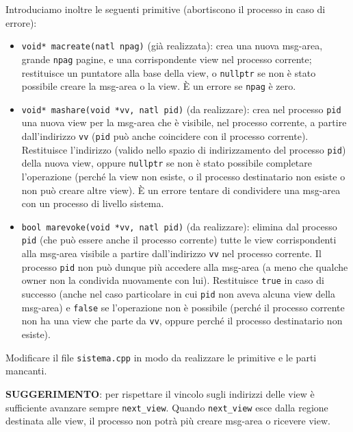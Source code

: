 Introduciamo inoltre le seguenti primitive (abortiscono il processo in caso di errore):

\begin{itemize}
  \item \verb|void* macreate(natl npag)| (gi\`a realizzata): crea una nuova msg-area, grande \verb|npag| pagine,
    e una corrispondente view nel processo corrente;
    restituisce un puntatore alla base della view, o \verb|nullptr| se non
    \`e stato possibile creare la msg-area o la view. \`E un errore se \verb|npag| \`e zero.
  \item \verb|void* mashare(void *vv, natl pid)| (da realizzare):
      crea nel processo \verb|pid| una nuova view per la msg-area
      che \`e visibile, nel processo corrente, a partire dall'indirizzo \verb|vv| (\verb|pid| pu\`o anche coincidere
      con il processo corrente). Restituisce l'indirizzo (valido nello
      spazio di indirizzamento del processo \verb|pid|) della nuova view, oppure \verb|nullptr| se non \`e stato
      possibile completare l'operazione (perch\'e la view non esiste, o il processo destinatario non esiste o non pu\`o
      creare altre view). \`E un errore tentare di condividere una msg-area con un processo di livello sistema.
    \item \verb|bool marevoke(void *vv, natl pid)| (da realizzare): elimina dal processo \verb|pid| (che pu\`o
      essere anche il processo corrente) tutte le view corrispondenti alla msg-area visibile
      a partire dall'indirizzo \verb|vv| nel processo corrente. Il processo \verb|pid| non pu\`o dunque pi\`u accedere alla msg-area (a meno
      che qualche owner non la condivida nuovamente con lui). Restituisce \verb|true| in caso di successo 
      (anche nel caso particolare in cui \verb|pid| non aveva alcuna view della msg-area) e \verb|false|
      se l'operazione non \`e possibile (perch\'e il processo corrente non ha una view che parte da \verb|vv|,
      oppure perch\'e il processo destinatario non esiste).
\end{itemize}

Modificare il file \verb|sistema.cpp| in modo da realizzare le primitive e le parti mancanti.

{\bf SUGGERIMENTO}: per rispettare il vincolo sugli indirizzi delle view \`e sufficiente avanzare sempre \verb|next_view|.
Quando \verb|next_view| esce dalla regione destinata alle view, il processo non potr\`a pi\`u creare msg-area o ricevere view.
